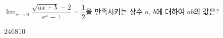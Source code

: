 $\displaystyle\lim_{x\to 0}\dfrac{\sqrt{ax+b}-2}{e^x-1}=\dfrac{1}{2}$을 만족시키는 상수 $a$, $b$에 대하여 $ab$의 값은?
\begin{choices32}{$2$}{$4$}{$6$}{$8$}{$10$}\end{choices32}
